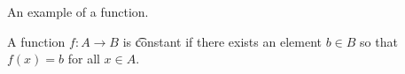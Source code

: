 

An example of a function.


A function $f: A \to B$ is \t{constant} if there exists an element $b \in B$ so that $f(x) = b$ for all $x \in A$.


\blankpage
